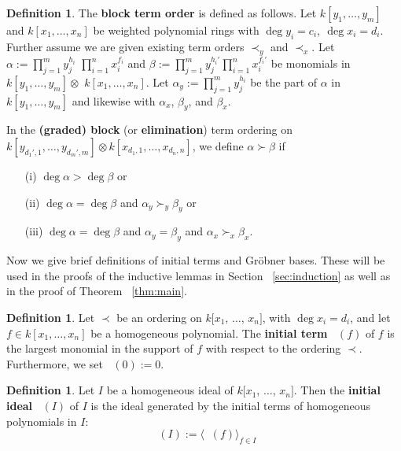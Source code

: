 \documentclass{amsart}
\theoremstyle{plain}
\theoremstyle{definition}
\newtheorem{defn}[thm]{Definition}
\theoremstyle{remark}
\numberwithin{equation}{section}
\DeclareMathOperator{\initial}{in_\prec}
\begin{document}
\begin{defn}
\label{defn:block-order}
The \textbf{block term order} is defined as follows. Let $k[y_{1}, \ldots, y_{m}]$ and $k[x_{1}, \ldots,
x_{n}]$ be weighted polynomial rings with $\deg y_i = c_i, \: \deg x_i = d_i.$ Further assume we are given existing term
orders $\prec_y$ and $\prec_x$. Let $\alpha :=
\prod_{j = 1}^{m} y_{j}^{h_i}$ $\prod_{i = 1}^{n} x_{i}
^{f_i}$ and $\beta := \prod_{j = 1}^{m} y_{j}^{h_i'}
\prod_{i = 1}^{n} x_{i}^{f_i'}$ be monomials in $k[y_{1},
\ldots, y_{m}] \otimes$ $k[x_{1}, \ldots, x_{n}]$.
Let $\alpha_y := \prod_{j = 1}^{m} y_{j}^{h_i}$ be the
part of $\alpha$ in $k[y_{1}, \ldots, y_{m}]$ and
likewise with $\alpha_x$, $\beta_y$, and $\beta_x$.

In the \textbf{(graded) block} (or \textbf{elimination}) term
ordering on $k[y_{d_1', 1}, \ldots, y_{d_m', m}] \otimes k[x_{d_1, 1},
\ldots, x_{d_n, n}]$, we define $\alpha \succ \beta$ if
  \begin{enumerate}
	\item[(i)] $\deg \alpha  > \deg \beta$ or
  \item[(ii)] $\deg \alpha = \deg \beta$ and $\alpha_y \succ_y \beta_y$ or
	\item[(iii)] $\deg \alpha = \deg \beta$ and $\alpha_y = \beta_y$ and $\alpha_x \succ_x \beta_x$.
  \end{enumerate}
\end{defn}

Now we give brief definitions of initial terms and Gr\"{o}bner
bases. These will be used in the proofs of the inductive lemmas
in Section ~\ref{sec:induction} as well as in the proof of Theorem
~\ref{thm:main}.

\begin{defn}
\label{defn:initial-term}
Let $\prec$ be an ordering on $k[x_{1}$, $\ldots$, $x_{n}]$, 
with $\deg x_i = d_i$,
and let $f \in k[x_{1}, \ldots, x_{n}]$ be a homogeneous
polynomial. The \textbf{initial term} $\initial(f)$ of $f$
is the largest monomial in the support of $f$ with respect to
the ordering $\prec$. Furthermore, we set $\initial(0) := 0$.
\end{defn}


\begin{defn}
\label{defn:initial-ideal}
Let $I$ be a homogeneous ideal of $k[x_{1}$, $\ldots$,
$x_{n}]$. Then the {\bf initial ideal} $\initial(I)$ of $I$ is
the ideal generated by the initial terms of homogeneous polynomials
in $I$:
\[
	\initial(I) := \langle \initial(f) \rangle_{f \in I}
\]
\end{defn}
\end{document}
